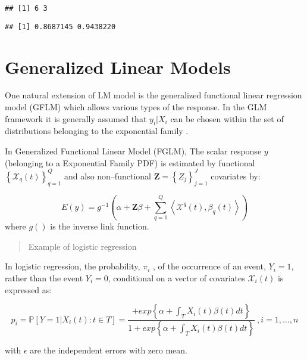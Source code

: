 \documentclass[
]{book}
\newenvironment{Shaded}{\begin{snugshade}}{\end{snugshade}}
\newcommand{\FunctionTok}[1]{\textcolor[rgb]{0.00,0.00,0.00}{#1}}
\newcommand{\NormalTok}[1]{#1}
\newcommand{\SpecialCharTok}[1]{\textcolor[rgb]{0.00,0.00,0.00}{#1}}
\begin{document}
\begin{verbatim}
## [1] 6 3
\end{verbatim}

\begin{Shaded}
\end{Shaded}

\begin{verbatim}
## [1] 0.8687145 0.9438220
\end{verbatim}

\hypertarget{generalized-linear-models}{%
\section{Generalized Linear Models}\label{generalized-linear-models}}

One natural extension of LM model is the generalized functional linear regression model (GFLM) which allows various types of the response. In the GLM framework it is generally assumed that \(y_i|X_i\) can be chosen within the set of distributions belonging to the exponential family \citep{muller2005generalized}.

In Generalized Functional Linear Model (FGLM), The scalar response \(y\)(belonging to a Exponential Family PDF) is estimated by functional \(\left\{\mathcal{X}_q(t)\right\}_{q=1}^Q\) and also non--functional \(\mathbf{Z}=\left\{{Z_j}\right\}_{j=1}^J\) covariates by:

\[E(y)=g^{-1}\left(\alpha+\mathbf{Z}\beta+\sum_{q=1}^Q \left\langle \mathcal{X}^{q}(t),\beta_{q}(t)\right\rangle\right) 
\]
where \(g()\) is the inverse link function.

\begin{quote}
Example of logistic regression
\end{quote}

In logistic regression, the probability, \(\pi_i\) , of the occurrence of an event, \(Y_i = 1\), rather than the event \(Y_i = 0\), conditional on a vector of covariates \(\mathcal{X}_i(t)\) is expressed as:

\[ p_i = \mathbb{P}[Y = 1|{X_i(t): t \in T }]=\frac{+exp\left\{\alpha+\int_{T}X_{i}(t)\beta(t)dt \right\}}{1+exp\left\{\alpha+\int_{T}X_{i}(t)\beta(t)dt \right\}}\ , i= 1,\ldots,n\]

with \(\epsilon\) are the independent errors with zero mean.
\end{document}
